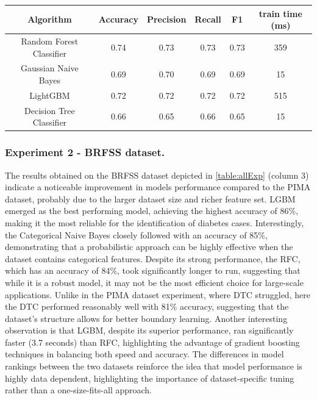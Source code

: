 \documentclass[runningheads]{llncs}
\begin{document}
\begin{center}
\begin{tabular}{ |c|c|c|c|c|c| } 
 \hline
 Algorithm & Accuracy & Precision & Recall & F1 & train time (ms) \\ 
 \hline\hline
 Random Forest Classifier &  {0.74} & 0.73 & 0.73 & 0.73 & 359 \\ 
 Gaussian Naive Bayes & 0.69 & 0.70 & 0.69 & 0.69 & 15  \\ 
 LightGBM & 0.72 & 0.72 & 0.72 & 0.72 & 515 \\ 
Decision Tree Classifier & 0.66 & 0.65 & 0.66 & 0.65 & 15 \\ 
 \hline
\end{tabular}
\label{table:PIMA_results}
\end{center}

\subsubsection{Experiment 2 - BRFSS dataset.} 

The results obtained on the BRFSS dataset depicted in \autoref{table:allExp}  (column 3) indicate a noticeable improvement in models performance compared to the PIMA dataset, probably due to the larger dataset size and richer feature set. 
LGBM emerged as the best performing model, achieving the highest accuracy of 86\%, making it the most reliable for the identification of diabetes cases. Interestingly, the Categorical Naive Bayes closely followed with an accuracy of 85\%, demonstrating that a probabilistic approach can be highly effective when the dataset contains categorical features. Despite its strong performance, the RFC, which has an accuracy of 84\%, took significantly longer to run, suggesting that while it is a robust model, it may not be the most efficient choice for large-scale applications. 
Unlike in the PIMA dataset experiment, where DTC struggled, here the DTC performed reasonably well with 81\% accuracy, suggesting that the dataset's structure allows for better boundary learning. Another interesting observation is that LGBM, despite its superior performance, ran significantly faster (3.7 seconds) than RFC, highlighting the advantage of gradient boosting techniques in balancing both speed and accuracy. 
The differences in model rankings between the two datasets reinforce the idea that model performance is highly data dependent, highlighting the importance of dataset-specific tuning rather than a one-size-fits-all approach.
\end{document}
